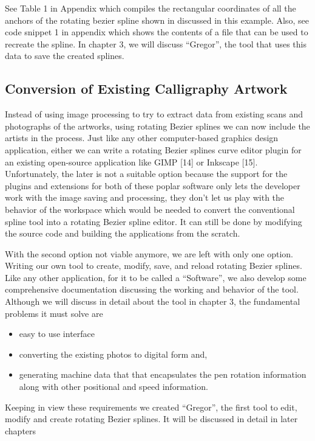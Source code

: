     See Table 1 in Appendix which compiles the rectangular coordinates of all the anchors of the rotating bezier spline shown in discussed in this example. Also, see code snippet 1 in appendix which shows the contents of a file that can be used to recreate the spline. In chapter 3, we will discuss “Gregor”, the tool that uses this data to save the created splines.

\subsection{Conversion of Existing Calligraphy Artwork}
Instead of using image processing to try to extract data from existing scans and photographs of the artworks, using rotating Bezier splines we can now include the artists in the process. Just like any other computer-based graphics design application, either we can write a rotating Bezier splines curve editor plugin for an existing open-source application like GIMP [14] or Inkscape [15]. Unfortunately, the later is not a suitable option because the support for the plugins and extensions for both of these poplar software only lets the developer work with the image saving and processing, they don’t let us play with the behavior of the workspace which would be needed to convert the conventional spline tool into a rotating Bezier spline editor. It can still be done by modifying the source code and building the applications from the scratch.

With the second option not viable anymore, we are left with only one option. Writing our own tool to create, modify, save, and reload rotating Bezier splines. Like any other application, for it to be called a “Software”, we also develop some comprehensive documentation discussing the working and behavior of the tool. Although we will discuss in detail about the tool in chapter 3, the fundamental problems it must solve are

\begin{itemize}
\item easy to use interface
\item converting the existing photos to digital form and,
\item generating machine data that that encapsulates the pen rotation information along with other positional and speed information.
\end{itemize}

Keeping in view these requirements we created “Gregor”, the first tool to edit, modify and create rotating Bezier splines. It will be discussed in detail in later chapters

